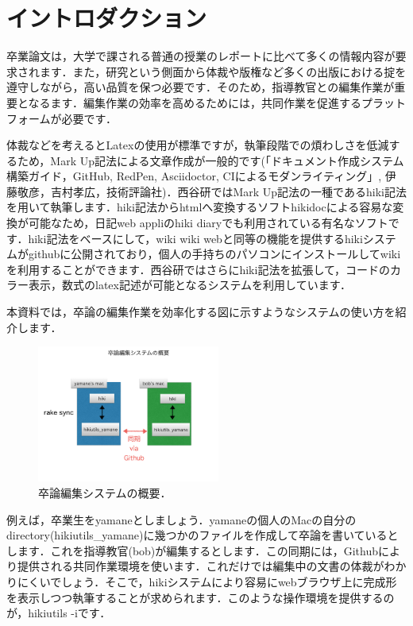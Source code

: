 
\section{イントロダクション}
卒業論文は，大学で課される普通の授業のレポートに比べて多くの情報内容が要求されます．また，研究という側面から体裁や版権など多くの出版における掟を遵守しながら，高い品質を保つ必要です．そのため，指導教官との編集作業が重要となるます．編集作業の効率を高めるためには，共同作業を促進するプラットフォームが必要です．

体裁などを考えるとLatexの使用が標準ですが，執筆段階での煩わしさを低減するため，Mark Up記法による文章作成が一般的です(「ドキュメント作成システム構築ガイド，GitHub, RedPen, Asciidoctor, CIによるモダンライティング」, 伊藤敬彦，吉村孝広，技術評論社)．西谷研ではMark Up記法の一種であるhiki記法を用いて執筆します．hiki記法からhtmlへ変換するソフトhikidocによる容易な変換が可能なため，日記web appliのhiki diaryでも利用されている有名なソフトです．hiki記法をベースにして，wiki wiki webと同等の機能を提供するhikiシステムがgithubに公開されており，個人の手持ちのパソコンにインストールしてwikiを利用することができます．西谷研ではさらにhiki記法を拡張して，コードのカラー表示，数式のlatex記述が可能となるシステムを利用しています．

本資料では，卒論の編集作業を効率化する図に示すようなシステムの使い方を紹介します．

\begin{figure}[htbp]\begin{center}
\includegraphics[width=6cm,bb=0 0 442 432]{../figs/./hikiutils_bob.002.jpeg}
\caption{卒論編集システムの概要．}
\label{default}\end{center}\end{figure}
例えば，卒業生をyamaneとしましょう．yamaneの個人のMacの自分のdirectory(hikiutils\_yamane)に幾つかのファイルを作成して卒論を書いているとします．これを指導教官(bob)が編集するとします．この同期には，Githubにより提供される共同作業環境を使います．これだけでは編集中の文書の体裁がわかりにくいでしょう．そこで，hikiシステムにより容易にwebブラウザ上に完成形を表示しつつ執筆することが求められます．このような操作環境を提供するのが，hikiutils -iです．

